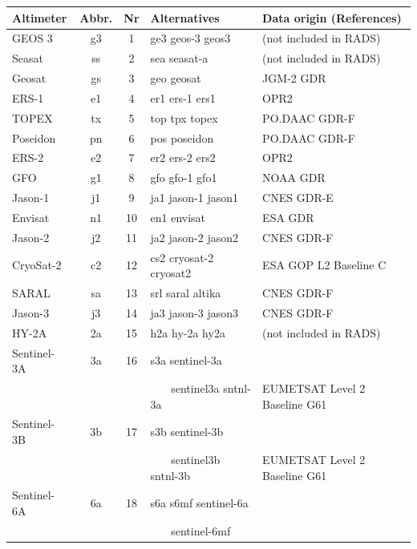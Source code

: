 \begin{table}
\begin{tabular}{lccll}
\hline
Altimeter & Abbr. & Nr & Alternatives & Data origin (References) \\
\hline
GEOS 3      & g3 &  1 & ge3 geos-3 geos3        & (not included in RADS) \\
Seasat      & ss &  2 & sea seasat-a            & (not included in RADS) \\
Geosat      & gs &  3 & geo geosat              & JGM-2 GDR \citep{cheney1991a} \\
ERS-1       & e1 &  4 & er1 ers-1 ers1          & OPR2 \citep{francis1990a,francis1991a} \\
TOPEX       & tx &  5 & top tpx topex           & PO.DAAC GDR-F \citep{rosmorduc2023} \\
Poseidon    & pn &  6 & pos poseidon            & PO.DAAC GDR-F \citep{rosmorduc2023} \\
ERS-2       & e2 &  7 & er2 ers-2 ers2          & OPR2 \citep{francis1995a} \\
GFO         & g1 &  8 & gfo gfo-1 gfo1          & NOAA GDR \\
Jason-1     & j1 &  9 & ja1 jason-1 jason1      & CNES GDR-E \citep{menard2003} \\
Envisat     & n1 & 10 & en1 envisat             & ESA GDR \\
Jason-2     & j2 & 11 & ja2 jason-2 jason2      & CNES GDR-F \citep{lambin2010} \\
CryoSat-2   & c2 & 12 & cs2 cryosat-2 cryosat2  & ESA GOP L2 Baseline C \citep{bouffard2015} \\
SARAL       & sa & 13 & srl saral altika        & CNES GDR-F \citep{bignalet2021} \\
Jason-3     & j3 & 14 & ja3 jason-3 jason3      & CNES GDR-F \\
HY-2A       & 2a & 15 & h2a hy-2a hy2a          & (not included in RADS) \\
Sentinel-3A & 3a & 16 & s3a sentinel-3a         &  \\
            &    &    & ~~~ sentinel3a sntnl-3a & EUMETSAT Level 2 Baseline G61 \\
Sentinel-3B & 3b & 17 & s3b sentinel-3b         &  \\
            &    &    & ~~~ sentinel3b sntnl-3b & EUMETSAT Level 2 Baseline G61 \\
Sentinel-6A & 6a & 18 & s6a s6mf sentinel-6a    &  \\
            &    &    & ~~~ sentinel-6mf   &  \\

\end{tabular}
\end{table}
